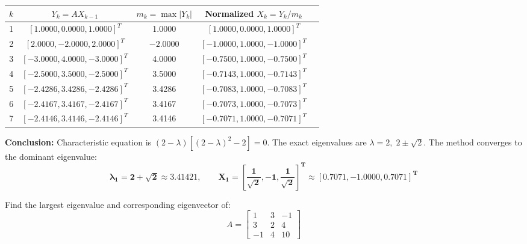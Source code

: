 \documentclass[11pt,a4paper]{article}
\begin{document}
\begin{solbox}
\begin{center}
\small
\begin{tabular}{ccccc}
    \toprule
    $k$ & $Y_k = A X_{k-1}$ & $m_k = \max |Y_k|$ & Normalized $X_k = Y_k / m_k$ \\
    \midrule
    1 & $[1.0000, 0.0000, 1.0000]^T$ & 1.0000 & $[1.0000, 0.0000, 1.0000]^T$ \\
    2 & $[2.0000, -2.0000, 2.0000]^T$ & $-2.0000$ & $[-1.0000, 1.0000, -1.0000]^T$ \\
    3 & $[-3.0000, 4.0000, -3.0000]^T$ & 4.0000 & $[-0.7500, 1.0000, -0.7500]^T$ \\
    4 & $[-2.5000, 3.5000, -2.5000]^T$ & 3.5000 & $[-0.7143, 1.0000, -0.7143]^T$ \\
    5 & $[-2.4286, 3.4286, -2.4286]^T$ & 3.4286 & $[-0.7083, 1.0000, -0.7083]^T$ \\
    6 & $[-2.4167, 3.4167, -2.4167]^T$ & 3.4167 & $[-0.7073, 1.0000, -0.7073]^T$ \\
    7 & $[-2.4146, 3.4146, -2.4146]^T$ & 3.4146 & $[-0.7071, 1.0000, -0.7071]^T$ \\
    \bottomrule
\end{tabular}
\end{center}
\textbf{Conclusion:} Characteristic equation is $(2-\lambda)[(2-\lambda)^2 - 2] = 0$. The exact eigenvalues are $\lambda = 2, \; 2 \pm \sqrt{2}$. The method converges to the dominant eigenvalue:
$$\mathbf{\lambda_1 = 2 + \sqrt{2} \approx 3.41421, \qquad X_1 = \left[\frac{1}{\sqrt{2}}, -1, \frac{1}{\sqrt{2}}\right]^T \approx [0.7071, -1.0000, 0.7071]^T}$$

\end{solbox}

\begin{exambox}
Find the largest eigenvalue and corresponding eigenvector of:
$$A = \begin{bmatrix} 1 & 3 & -1 \\ 3 & 2 & 4 \\ -1 & 4 & 10 \end{bmatrix}$$
\end{exambox}
\end{document}
